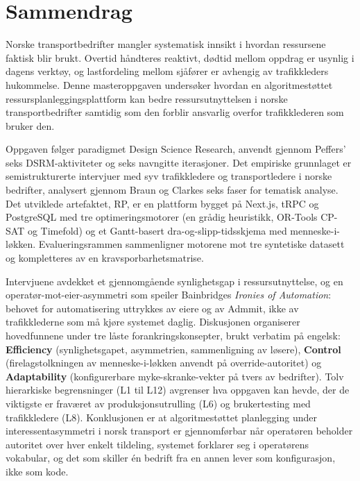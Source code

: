 \chapter*{Sammendrag}

Norske transportbedrifter mangler systematisk innsikt i hvordan ressursene faktisk blir brukt. Overtid håndteres reaktivt, dødtid mellom oppdrag er usynlig i dagens verktøy, og lastfordeling mellom sjåfører er avhengig av trafikkleders hukommelse. Denne masteroppgaven undersøker hvordan en algoritmestøttet ressursplanleggingsplattform kan bedre ressursutnyttelsen i norske transportbedrifter samtidig som den forblir ansvarlig overfor trafikklederen som bruker den.

Oppgaven følger paradigmet Design Science Research, anvendt gjennom Peffers' seks DSRM-aktiviteter og seks navngitte iterasjoner. Det empiriske grunnlaget er semistrukturerte intervjuer med syv trafikkledere og transportledere i norske bedrifter, analysert gjennom Braun og Clarkes seks faser for tematisk analyse. Det utviklede artefaktet, RP, er en plattform bygget på Next.js, tRPC og PostgreSQL med tre optimeringsmotorer (en grådig heuristikk, OR-Tools CP-SAT og Timefold) og et Gantt-basert dra-og-slipp-tidsskjema med menneske-i-løkken. Evalueringsrammen sammenligner motorene mot tre syntetiske datasett og kompletteres av en kravsporbarhetsmatrise.

Intervjuene avdekket et gjennomgående synlighetsgap i ressursutnyttelse, og en operatør-mot-eier-asymmetri som speiler Bainbridges \emph{Ironies of Automation}: behovet for automatisering uttrykkes av eiere og av Admmit, ikke av trafikklederne som må kjøre systemet daglig. Diskusjonen organiserer hovedfunnene under tre låste forankringskonsepter, brukt verbatim på engelsk: \textbf{Efficiency} (synlighetsgapet, asymmetrien, sammenligning av løsere), \textbf{Control} (firelagstolkningen av menneske-i-løkken anvendt på override-autoritet) og \textbf{Adaptability} (konfigurerbare myke-skranke-vekter på tvers av bedrifter). Tolv hierarkiske begrensninger (L1 til L12) avgrenser hva oppgaven kan hevde, der de viktigste er fraværet av produksjonsutrulling (L6) og brukertesting med trafikkledere (L8). Konklusjonen er at algoritmestøttet planlegging under interessentasymmetri i norsk transport er gjennomførbar når operatøren beholder autoritet over hver enkelt tildeling, systemet forklarer seg i operatørens vokabular, og det som skiller én bedrift fra en annen lever som konfigurasjon, ikke som kode.
